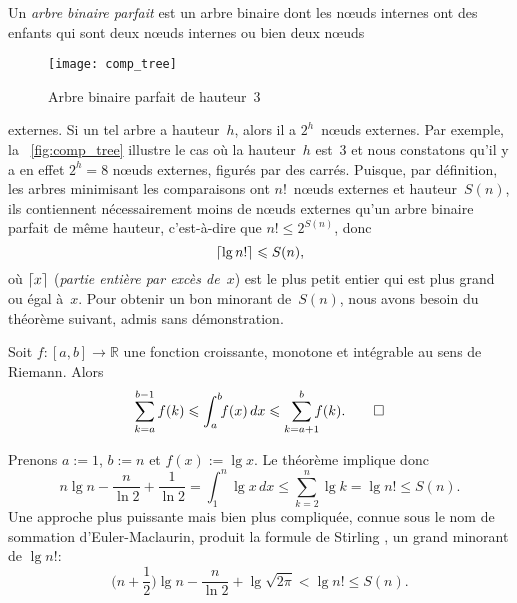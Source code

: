%
Un \emph{arbre binaire parfait}
est un arbre binaire dont les n{\oe}uds internes ont des enfants qui
sont deux n{\oe}uds internes ou bien deux n{\oe}uds
\begin{wrapfigure}[]{r}[0pt]{0pt}
\centering
\texttt{[image: comp\_tree]}
\caption{Arbre binaire parfait de hauteur~\(3\)}
\label{fig:comp_tree}
\end{wrapfigure}
externes. Si un tel arbre a hauteur~\(h\), alors il a
\(2^h\)~n{\oe}uds externes. Par exemple, la \fig~\vref{fig:comp_tree}
illustre le cas où la hauteur~\(h\) est~\(3\) et nous constatons qu'il
y a en effet \(2^h=8\) n{\oe}uds externes, figurés par des
carrés. Puisque, par définition, les arbres minimisant les
comparaisons ont \(n!\)~n{\oe}uds externes et hauteur~\(S(n)\), ils
contiennent nécessairement moins de n{\oe}uds externes qu'un arbre
binaire parfait de même hauteur, c'est-à-dire que \(n! \leqslant
2^{S(n)}\), donc
\begin{equation*}
\lceil{\lg n!}\rceil \leqslant S(n),
\end{equation*}
où \(\lceil{x}\rceil\) (\textsl{partie entière par excès de~\(x\)})
  est le plus petit entier
qui est plus grand ou égal à~\(x\). Pour obtenir un bon minorant
de~\(S(n)\), nous avons besoin du théorème suivant, admis sans
démonstration.  \setlength{\intextsep}{12pt}
\begin{thm}
\label{thm:integral_bounds}
Soit \(f\colon [a,b] \rightarrow \mathbb{R}\) une fonction croissante,
monotone et intégrable au sens de Riemann. Alors
\begin{equation}
\abovedisplayskip=0pt
\sum_{k=a}^{b-1}f(k) \leqslant \int_{a}^{b}{\!\!f(x)} \,dx
                   \leqslant \sum_{k=a+1}^{b}{\!\!\!f(k)}.
\tag*{\(\Box\)}
\end{equation}
\end{thm}
\noindent Prenons \(a := 1\), \(b := n\) et \(f(x) := \lg x\). Le
théorème implique donc
\begin{equation*}
n\lg n - \frac{n}{\ln 2} + \frac{1}{\ln 2}
= \int_{1}^{n}{\!\!\lg x} \,dx \leqslant \sum_{k=2}^{n}{\lg k}
= \lg n! \leqslant S(n).
\end{equation*}
Une approche plus puissante mais bien plus compliquée, connue sous le
nom de sommation d'Euler-Maclaurin, produit la formule de Stirling
\citep[chap.~4]{SedgewickFlajolet_1996},
un grand minorant de \(\lg n!\):
\begin{equation}
\Big(n + \frac{1}{2}\Big)\lg n - \frac{n}{\ln 2} + \lg\sqrt{2\pi}
< \lg n! \leqslant S(n).
\label{ineq:S_lower}
\end{equation}

